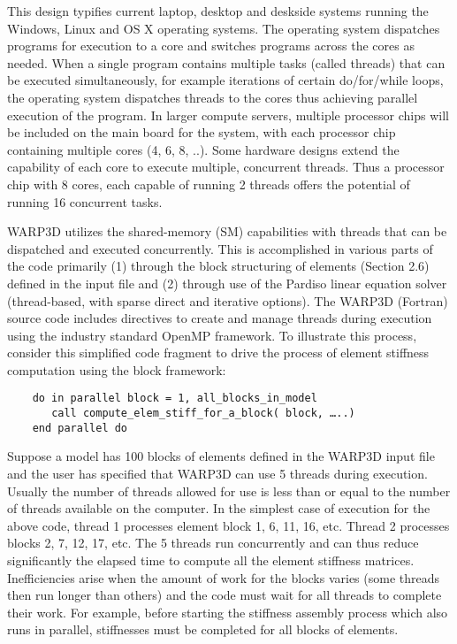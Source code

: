 This design typifies current laptop, desktop and deskside 
systems running the Windows, Linux and OS X operating systems. 
The operating system dispatches programs for execution to 
a core and switches programs across the cores as needed. When a single program 
contains multiple tasks (called threads) that can be executed 
simultaneously, for example
iterations of certain do/for/while loops,
the operating system dispatches threads to the cores 
thus achieving parallel execution of the program. In larger compute servers, 
multiple processor chips will be included on the main board for the system, 
with each processor chip containing multiple cores (4, 6, 8, ..). Some hardware
designs extend the capability of each core to execute multiple, concurrent
threads. Thus a processor chip with 8 cores, each capable of running
2 threads offers the potential of running 16 concurrent tasks.

WARP3D utilizes the shared-memory (SM) capabilities with threads 
that can be dispatched and executed concurrently. 
This is accomplished in various parts of the code primarily (1) through 
the block structuring of elements (Section 2.6) defined in the 
input file and (2) through use of the Pardiso linear
equation solver (thread-based, with sparse direct and iterative
options). 
The WARP3D (Fortran) source code includes directives to create and 
manage threads during execution using the industry standard 
OpenMP framework. To illustrate this process, consider this 
simplified code fragment to drive the process of element 
stiffness computation using the block framework:

\small
\begin{verbatim}
    do in parallel block = 1, all_blocks_in_model
       call compute_elem_stiff_for_a_block( block, …..)
    end parallel do 
\end{verbatim}
\normalsize

Suppose a model has 100 blocks of elements defined in the WARP3D input file and the user 
has specified that WARP3D can use 5 threads during execution. Usually 
the number of threads allowed for use is less than or equal to the number of threads
available on the computer. In the simplest 
case of execution for the above code, thread 1 processes element block 1, 6, 11, 16, etc. 
Thread 2 processes blocks 2, 7, 12, 17, etc. The 5 threads run concurrently and 
can thus reduce significantly the elapsed time to compute all the element stiffness matrices. 
Inefficiencies arise when the amount of work for the blocks varies (some threads then 
run longer than others) and the code must wait for all threads to complete their work.
For example, before starting the stiffness assembly process which also runs in parallel,
stiffnesses must be completed for all blocks of elements.

